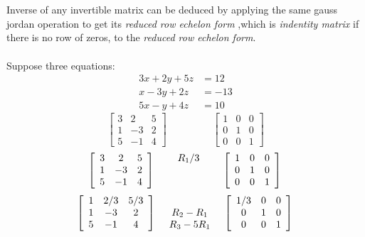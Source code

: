 \documentclass[a4paper, 12pt]{article}
\begin{document}
\\
\\
Inverse of any invertible matrix can be deduced by applying the same gauss jordan operation
to get its \textit{reduced row echelon form} ,which is \textit{indentity matrix} 
if there is no row of zeros,
to the \textit{reduced row echelon form}.
\\
\\
Suppose three equations:
\begin{align*}
3x + 2y + 5z &= 12\\
x - 3y + 2z &= -13\\
5x - y + 4z &= 10 
\end{align*}
\[
\left[{
\begin{array}{ccc}
3 & 2 & 5 \\
1 & -3 & 2 \\
5 & -1 & 4
\end{array}
}
\right]
\begin{array}{ccc}
\ \ \ \ \ \ \ \ \ \ \ \ \ \ \ \ \  \\
\ \ \ \ \ \ \ \ \ \ \ \ \ \ \ \ \  \\
\ \ \ \ \ \ \ \ \ \ \ \ \ \ \ \ \  
\end{array}
\left[{
\begin{array}{ccc}
1 & 0 & 0\\
0 & 1 & 0\\
0 & 0 & 1
\end{array} 
}
\right] 
\] 
\[
\left[{
\begin{array}{ccc}
3 & 2 & 5 \\
1 & -3 & 2 \\
5 & -1 & 4
\end{array}
}
\right]
\begin{array}{ccc}
R_1/3 \\
\ \ \ \ \ \ \ \ \ \ \ \ \ \ \ \ \  \\
\ \ \ \ \ \ \ \ \ \ \ \ \ \ \ \ \  
\end{array}
\left[{
\begin{array}{ccc}
1 & 0 & 0\\
0 & 1 & 0\\
0 & 0 & 1
\end{array} 
}
\right]\\ 
\] 
\[
\left[{
\begin{array}{ccc}
1 & 2/3 & 5/3 \\
1 & -3 & 2 \\
5 & -1 & 4
\end{array}
}
\right]
\begin{array}{ccc}
\ \ \ \ \ \ \ \ \ \ \ \ \ \ \ \ \  \\
R_2 - R_1 \\
R_3 - 5R_1
\end{array}
\left[{
\begin{array}{ccc}
1/3 & 0 & 0\\
0 & 1 & 0\\
0 & 0 & 1
\end{array} 
}
\right]\\ 
\] 
\end{document}
